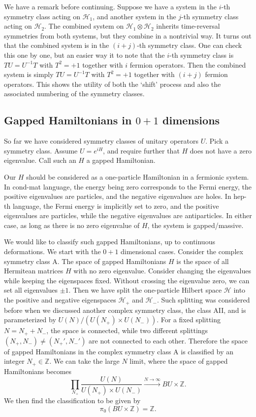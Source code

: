 \documentclass[12pt]{article}
\numberwithin{equation}{section}
\numberwithin{figure}{section}
\theoremstyle{remark}
\def\bZ{\mathbb{Z}}
\def\cH{\mathcal{H}}
\begin{document}
We have a remark before continuing. 
   Suppose we have a system in the $i$-th symmetry class acting on $\cH_1$,
  and another system in the $j$-th symmetry class acting on $\cH_2$.
  The combined system on $\cH_1\otimes \cH_2$ inherits time-reversal symmetries from both systems,
  but they combine in a nontrivial way.
  It turns out that the combined system is in the $(i+j)$-th symmetry class.
  One can check this one by one, but an easier way it to note that the $i$-th
  symmetry class is $TU=U^{-1}T$ with $T^2=+1$ together with $i$ fermion operators.
  Then the combined system is simply $TU=U^{-1}T$ with $T^2=+1$ together with $(i+j)$ fermion operators.
  This shows the utility of both the `shift' process 
  and also the associated numbering of the symmetry classes. 

\subsection{Gapped Hamiltonians in $0+1$ dimensions}

So far we have considered symmetry classes of unitary operators $U$.
Pick a symmetry class.
Assume $U=e^{iH}$, and require further that $H$ does not have a zero eigenvalue.
Call such an $H$ a gapped Hamiltonian.

Our $H$ should be considered as a one-particle Hamiltonian in a fermionic system.
In cond-mat language, the energy being zero  corresponds to the Fermi energy,
the positive eigenvalues are particles, and the negative eigenvalues are holes. 
In hep-th language, the Fermi energy is implicitly set to zero, and the positive eigenvalues are particles, while the negative eigenvalues are antiparticles.
In either case, as long as there is no zero eigenvalue of $H$,
the system is gapped/massive.

We would like to classify such gapped Hamiltonians, up to continuous deformations.
We start with the $0+1$ dimensional cases.
Consider the complex symmetry class A.
The space of gapped Hamiltonians $H$ is the space of all Hermitean matrices $H$ with no zero eigenvalue.
Consider changing the eigenvalues while keeping the eigenspaces fixed.
Without crossing the eigenvalue zero, we can set all eigenvalues $\pm1$.
Then we have split the one-particle Hilbert space $\cH$ into the 
positive and negative eigenspaces $\cH_+$ and $\cH_-$.
Such splitting was considered before when we discussed another complex symmetry class, 
the class AII, and is parameterized by $U(N)/(U(N_+)\times U(N_-))$.
For a fixed splitting $N=N_++N_-$, the space is connected,
while two different splittings $(N_+,N_-)\neq (N_+',N_-')$ are not connected to each other.
Therefore the space of gapped Hamiltonians in the complex symmetry class A
is classified by an integer $N_+\in \bZ$.
We can take the large $N$ limit, where the space of gapped Hamiltonians becomes
\begin{equation}
\prod_{N_+} \frac{U(N)}{U(N_+)\times U(N_-)} \xrightarrow{N\to\infty} BU\times \bZ.
\end{equation}
We then find the classification to be given by \begin{equation}
  \pi_0(BU\times \bZ)=\bZ.
\end{equation}
\end{document}
